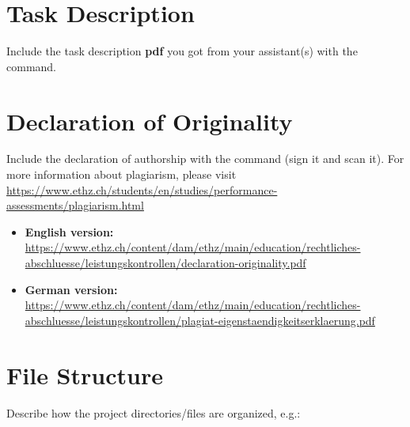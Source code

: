 
\chapter{Task Description}
Include the task description \textbf{pdf} you got from your
assistant(s) with the  command.
%


\chapter{Declaration of Originality}\label{chap:originality}
Include the declaration of authorship with the  command (sign it and scan it). For more information
about plagiarism, please visit
\url{https://www.ethz.ch/students/en/studies/performance-assessments/plagiarism.html}

\begin{itemize}
\item \textbf{English version:}
  \url{https://www.ethz.ch/content/dam/ethz/main/education/rechtliches-abschluesse/leistungskontrollen/declaration-originality.pdf}
\item \textbf{German version:}
  \url{https://www.ethz.ch/content/dam/ethz/main/education/rechtliches-abschluesse/leistungskontrollen/plagiat-eigenstaendigkeitserklaerung.pdf}
\end{itemize}




\chapter{File Structure}
Describe how the project directories/files are organized, e.g.:

